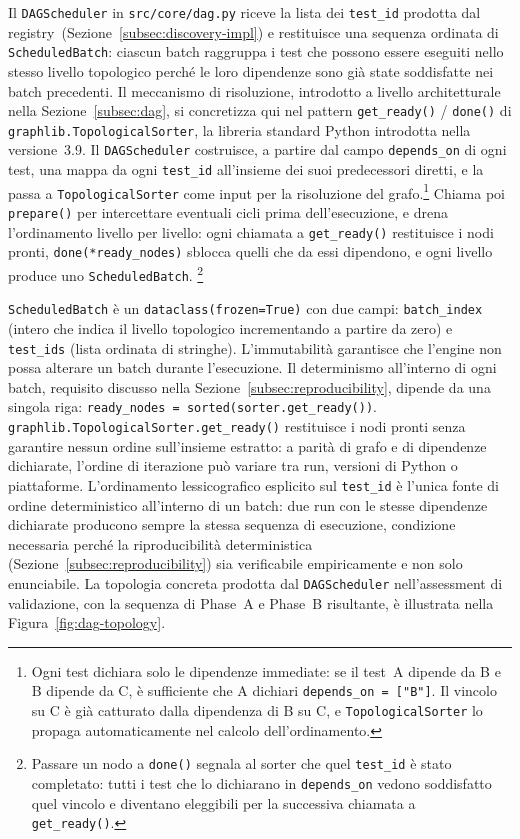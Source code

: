 Il \texttt{DAGScheduler} in \texttt{src/core/dag.py} riceve la lista dei \texttt{test\_id} prodotta dal registry~(Sezione~\ref{subsec:discovery-impl}) e restituisce una sequenza ordinata di \texttt{ScheduledBatch}: ciascun batch raggruppa i test che possono essere eseguiti nello stesso livello topologico perché le loro dipendenze sono già state soddisfatte nei batch precedenti.
Il meccanismo di risoluzione, introdotto a livello architetturale nella Sezione~\ref{subsec:dag}, si concretizza qui nel pattern \texttt{get\_ready()} / \texttt{done()} di \texttt{graphlib.TopologicalSorter}, la libreria standard Python introdotta nella versione~3.9.
Il \texttt{DAGScheduler} costruisce, a partire dal campo \texttt{depends\_on} di ogni test, una mappa da ogni \texttt{test\_id} all'insieme dei suoi predecessori diretti, e la passa a \texttt{TopologicalSorter} come input per la risoluzione del grafo.\footnote{Ogni test dichiara solo le dipendenze immediate: se il test~A dipende da B e B dipende da C, è sufficiente che A dichiari \texttt{depends\_on = ["B"]}.
Il vincolo su C è già catturato dalla dipendenza di B su C, e \texttt{TopologicalSorter} lo propaga automaticamente nel calcolo dell'ordinamento.} Chiama poi \texttt{prepare()} per intercettare eventuali cicli prima dell'esecuzione, e drena l'ordinamento livello per livello: ogni chiamata a \texttt{get\_ready()} restituisce i nodi pronti, \texttt{done(*ready\_nodes)} sblocca quelli che da essi dipendono, e ogni livello produce uno \texttt{ScheduledBatch}.
\footnote{Passare un nodo a \texttt{done()} segnala al sorter che quel \texttt{test\_id} è stato completato: tutti i test che lo dichiarano in \texttt{depends\_on} vedono soddisfatto quel vincolo e diventano eleggibili per la successiva chiamata a \texttt{get\_ready()}.}

\texttt{ScheduledBatch} è un \texttt{dataclass(frozen=True)} con due campi: \texttt{batch\_index} (intero che indica il livello topologico incrementando a partire da zero) e \texttt{test\_ids} (lista ordinata di stringhe). L'immutabilità garantisce che l'engine non possa alterare un batch durante l'esecuzione. Il determinismo all'interno di ogni batch, requisito discusso nella Sezione~\ref{subsec:reproducibility}, dipende da una singola riga: \texttt{ready\_nodes~=~sorted(sorter.get\_ready())}. \texttt{graphlib.TopologicalSorter.get\_ready()} restituisce i nodi pronti senza garantire nessun ordine sull'insieme estratto: a parità di grafo e di dipendenze dichiarate, l'ordine di iterazione può variare tra run, versioni di Python o piattaforme. L'ordinamento lessicografico esplicito sul \texttt{test\_id} è l'unica fonte di ordine deterministico all'interno di un batch: due run con le stesse dipendenze dichiarate producono sempre la stessa sequenza di esecuzione, condizione necessaria perché la riproducibilità deterministica (Sezione~\ref{subsec:reproducibility}) sia verificabile empiricamente e non solo enunciabile. La topologia concreta prodotta dal \texttt{DAGScheduler} nell'assessment di validazione, con la sequenza di Phase~A e Phase~B risultante, è illustrata nella Figura~\ref{fig:dag-topology}.

